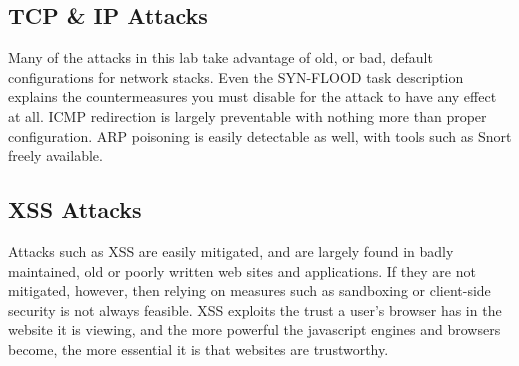 \subsection{TCP \& IP Attacks}

Many of the attacks in this lab take advantage of old, or bad, default configurations for network stacks. Even the
SYN-FLOOD task description explains the countermeasures you must disable for the attack to have any effect at all. ICMP
redirection is largely preventable with nothing more than proper configuration\cite{sysctl}.
ARP poisoning is easily detectable as well, with tools such as Snort freely available\cite{snort}\cite{snort_arp}.

\subsection{XSS Attacks}

Attacks such as XSS are easily mitigated\cite{cheatsheet}, and are largely found in badly maintained, old or poorly
written web sites and applications. If they are not mitigated, however, then relying on measures such as sandboxing or
client-side security is not always feasible. XSS exploits the trust a user's browser has in the website it is viewing,
and the more powerful the javascript engines and browsers become, the more essential it is that websites are
trustworthy.
